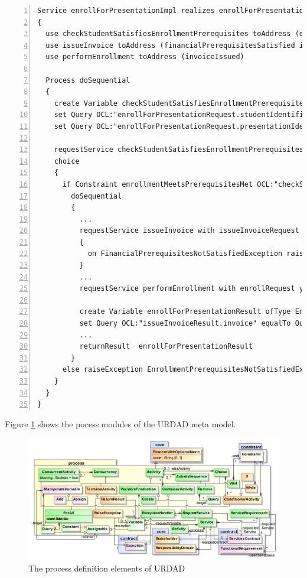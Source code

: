 \lstset{language=urdad,caption=Specifying a service in the textual URDAD DSL syntax.,label=serviceTextSyntax}
\begin{lstlisting}[numbers=left,escapechar=|]
Service enrollForPresentationImpl realizes enrollForPresentation receiving Variable enrollForPresentationRequest ofType EnrollForPresentationRequest
{
  use checkStudentSatisfiesEnrollmentPrerequisites toAddress (enrollmentPrerequisitesMet)
  use issueInvoice toAddress (financialPrerequisitesSatisfied invoiceIssued) 
  use performEnrollment toAddress (invoiceIssued)
   
  Process doSequential
  {
    create Variable checkStudentSatisfiesEnrollmentPrerequisitesRequest ofType CheckStudentSatisfiesEnrollmentPrerequisitesRequest               
    set Query OCL:"enrollForPresentationRequest.studentIdentifier" equalTo Query OCL:"checkEnrollmentPrerequisitesRequest.studentIdentifier"
    set Query OCL:"enrollForPresentationRequest.presentationIdentifier" equalTo Query OCL:"checkEnrollmentPrerequisitesRequest.presentationIdentifier"
                     
    requestService checkStudentSatisfiesEnrollmentPrerequisites with checkStudentSatisfiesEnrollmentPrerequisitesRequest yielding Variable checkStudentSatisfiesEnrollmentPrerequisitesResult ofType CheckStudentSatisfiesEnrollmentPrerequisitesResult
    choice
    {
      if Constraint enrollmentMeetsPrerequisitesMet OCL:"checkStudentSatisfiesEnrollmentPrerequisitesResult.enrollmentPrerequisitesMet = true"
        doSequential
        {
          ...
          requestService issueInvoice with issueInvoiceRequest yielding Variable issueInvoiceResult ofType IssueInvoiceResult
          {
            on FinancialPrerequisitesNotSatisfiedException raiseException FinancialPrerequisitesNotSatisfiedException
          }
	      ...
          requestService performEnrollment with enrollRequest yielding Variable performEnrollmentResult ofType PerformEnrollmentResult
          
          create Variable enrollForPresentationResult ofType EnrollForPresentationResult
          set Query OCL:"issueInvoiceResult.invoice" equalTo Query OCL:"enrollForPresentationResult.invoice"
          ...                       
          returnResult  enrollForPresentationResult
        }
      else raiseException EnrollmentPrerequisitesNotSatisfiedException
    }
  }
}                 
\end{lstlisting}

Figure \ref{fig:processModule} shows the pocess modules of the URDAD meta model.
\begin{figure}[Htbp]
  \centering
  \includegraphics{process}
  \caption{The process definition elements of URDAD}
  \label{fig:processModule}
\end{figure}
 
